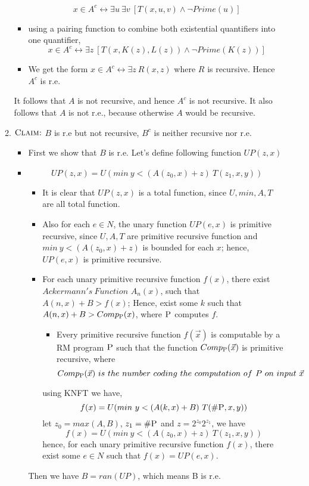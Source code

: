 \documentclass[11pt,twoside]{article}
\begin{document}
\begin{enumerate}[leftmargin=0pt]
\begin{enumerate}
\begin{itemize}[label = {}]
		\[x \in A^c \leftrightarrow \exists u \ \exists v \ [T(x,u,v) \wedge \neg Prime(u)] \]
	\item using a pairing function  to combine both existential quantifiers into one quantifier,
		\[ x \in A^c \leftrightarrow \exists z \ [T(x,K(z),L(z)) \wedge \neg Prime(K(z))]\]
	\item We get the form $x \in A^c \leftrightarrow \exists z \ R(x,z)$ where $R$ is recursive. Hence $A^c$ is r.e. 
	\end{itemize}
	It follows that $A$ is not recursive, and hence $A^c$ is not recursive. It also follows that $A$ is not r.e., because otherwise $A$ would be recursive. 

\item $\textsc {Claim:}$  $B$ is r.e but not recursive, $B^c$ is neither recursive nor r.e.
	\begin{itemize}[label = {}]
	\item First we show that $B$ is  r.e. Let's define following function $UP(z,x)$
	\item  \[UP(z,x)= U(min \ y < (A(z_0,x)+ z)   \ T(z_{1}, x, y))\]
        		\begin{itemize}
        		\item	 It is clear that $UP(z,x)$ is a total function, since $U,min, A,T$ are all total function.
        		\item Also for each $e \in N$, the unary function $UP(e,x)$ is primitive recursive, since $U, A,T$ are primitive recursive function and $min \ y < (A(z_0,x)+ z)$ is bounded for each $x$; hence, $UP(e,x)$ is primitive recursive.
        		\item For each unary primitive recursive function $f(x)$, there exist $Ackermann's\ Function$ $A_n(x)$, such that $A(n,x) + B > f(x)$; Hence,  exist  some $k$ such that $A(n,x) + B > Comp_{\textsc P}(x)$, where ${\textsc P}$ computes $f$.
        	
        			\begin{itemize}[label={}]
        			\item Every primitive recursive function $f(\vec x)$ is computable by a RM program $\textsc P$ such that the function $Comp_{\textsc P}(\vec x)$ is primitive recursive, where
        		\[ Comp_{\proc P} (\vec x) \ is \ the \ number \ coding \ the \ computation \ of \proc \ P \ on \ input\ \vec x\]
        			\end{itemize}
			using KNFT we have,	
					\[f(x) =  U(min \ y < (A(k,x)+ B)   \ T(\#\textsc P, x, y)) \]		
			let $z_0 = max(A,B)$, $z_1 = \#\textsc P$ and $z = 2^{z_0}2^{z_1}$, we have
					\[f(x) = U(min \ y < (A(z_0,x)+ z)   \ T(z_{1}, x, y))\]
			hence, for each unary primitive recursive function $f(x)$, there exist some $e \in N$ such that $f(x) = UP(e,x)$.
		\end{itemize}
		Then we have $B = ran(UP)$, which means B is r.e.
	

\end{itemize}
\end{enumerate}
\end{enumerate}
\end{document}
